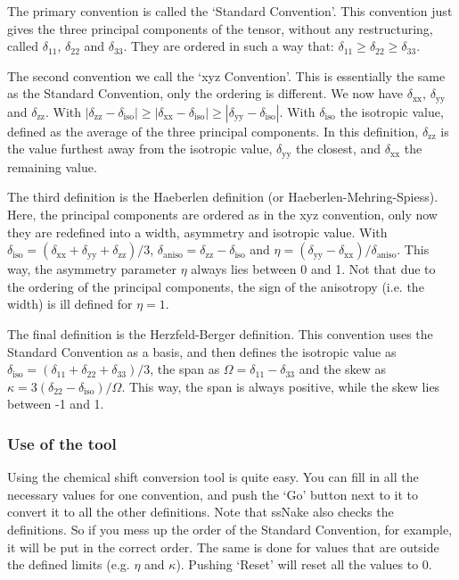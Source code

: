 \documentclass[11pt,a4paper]{article}
\begin{document}
The primary convention is called the `Standard Convention'. This convention just gives the three principal components of the tensor, without any restructuring, called $\delta_\text{11}$, $\delta_\text{22}$ and $\delta_\text{33}$. They are ordered in such a way that: $\delta_\text{11} \geq \delta_\text{22} \geq \delta_\text{33}$.

The second convention we call the `xyz Convention'. This is essentially the same as the Standard Convention, only the ordering is different. We now have $\delta_\text{xx}$, $\delta_\text{yy}$ and $\delta_\text{zz}$. With $|\delta_\text{zz}-\delta_\text{iso}| \geq |\delta_\text{xx}-\delta_\text{iso}| \geq |\delta_\text{yy}-\delta_\text{iso}|$. With $\delta_\text{iso}$ the isotropic value, defined as the average of the three principal components. In this definition, $\delta_\text{zz}$ is the value furthest away from the isotropic value, $\delta_\text{yy}$ the closest, and $\delta_\text{xx}$ the remaining value.

The third definition is the Haeberlen definition (or Haeberlen-Mehring-Spiess). Here, the principal components are ordered as in the xyz convention, only now they are redefined into a width, asymmetry and isotropic value. With $\delta_\text{iso} = (\delta_\text{xx} +\delta_\text{yy} +\delta_\text{zz})/3$, $\delta_\text{aniso} = \delta_\text{zz} -\delta_\text{iso}$ and $\eta = (\delta_\text{yy}-\delta_\text{xx})/\delta_\text{aniso}$. This way, the asymmetry parameter $\eta$ always lies between 0 and 1. Not that due to the ordering of the principal components, the sign of the anisotropy (i.e. the width) is ill defined for $\eta=1$.

The final definition is the Herzfeld-Berger definition. This convention uses the Standard Convention as a basis, and then defines the isotropic value as $\delta_\text{iso} = (\delta_\text{11} + \delta_\text{22} + \delta_\text{33})/3$, the span as $\Omega = \delta_\text{11} - \delta_\text{33}$ and the skew as $\kappa = 3(\delta_\text{22}-\delta_\text{iso})/\Omega$. This way, the span is always positive, while the skew lies between -1 and 1.



\subsubsection*{Use of the tool}
Using the chemical shift conversion tool is quite easy. You can fill in all the necessary values for one convention, and push the `Go' button next to it to convert it to all the other definitions. Note that ssNake also checks the definitions. So if you mess up the order of the Standard Convention, for example, it will be put in the correct order. The same is done for values that are outside the defined limits (e.g. $\eta$ and $\kappa$). Pushing `Reset' will reset all the values to 0.
\end{document}
